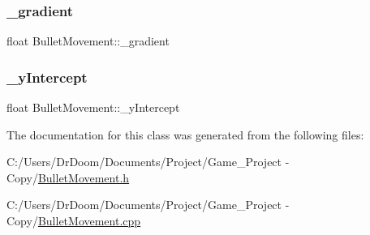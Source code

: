 \mbox{\label{class_bullet_movement_a21abb8a9b6d5d1d6cd5e079648ade529}} 
\subsubsection{\texorpdfstring{\+\_\+gradient}{\_gradient}}
{\footnotesize\ttfamily float Bullet\+Movement\+::\+\_\+gradient\hspace{0.3cm}{\ttfamily [private]}}

\mbox{\label{class_bullet_movement_a8d20043e5da44b2585b78e0be9d9ad66}} 
\subsubsection{\texorpdfstring{\+\_\+y\+Intercept}{\_yIntercept}}
{\footnotesize\ttfamily float Bullet\+Movement\+::\+\_\+y\+Intercept\hspace{0.3cm}{\ttfamily [private]}}



The documentation for this class was generated from the following files\+:\begin{DoxyCompactItemize}
\item 
C\+:/\+Users/\+Dr\+Doom/\+Documents/\+Project/\+Game\+\_\+\+Project -\/ Copy/\hyperlink{_bullet_movement_8h}{Bullet\+Movement.\+h}\item 
C\+:/\+Users/\+Dr\+Doom/\+Documents/\+Project/\+Game\+\_\+\+Project -\/ Copy/\hyperlink{_bullet_movement_8cpp}{Bullet\+Movement.\+cpp}\end{DoxyCompactItemize}
